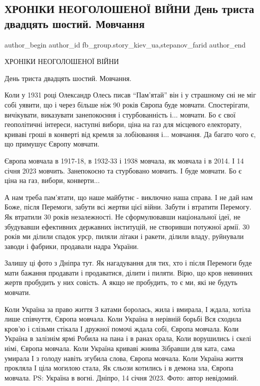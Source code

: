  
 
 
 
 

\subsection{ХРОНІКИ НЕОГОЛОШЕНОЇ ВІЙНИ  День триста двадцять шостий. Мовчання}
\label{sec:15_01_2023.fb.fb_group.story_kiev_ua.1.khron_ki_neogoloshen}
 
\ifcmt
 author_begin
   author_id fb_group.story_kiev_ua,stepanov_farid
 author_end
\fi

ХРОНІКИ НЕОГОЛОШЕНОЇ ВІЙНИ 

День триста двадцять шостий. Мовчання. 

Коли у 1931 році Олександр Олесь писав \enquote{Пам'ятай} він і у страшному сні не
міг собі уявити, що і через більше ніж 90 років Європа буде мовчати.
Спостерігати, вичікувати, виказувати занепокоєння і стурбованність і...
мовчати. Бо є свої геополітичні інтереси, наступні вибори, ціна на газ для
місцевого електорату, криваві гроші в конверті від кремля за лобіювання і...
мовчання. Да багато чого є, що примушує Європу мовчати. 

Європа мовчала в 1917-18, в 1932-33 і 1938 мовчала, як мовчала і в 2014. І
14 січня 2023 мовчить. Занепокоєно та стурбовано мовчить. І буде мовчати. Бо
є ціна на газ, вибори, конверти... 

А нам треба пам'ятати, що наше майбутнє - виключно наша справа. І не дай нам
Боже, після Перемоги, забути всі жертви цієї війни. Забути і втратити
Перемогу. Як втратили 30 років незалежності. Не сформулювавши національної
ідеї, не збудувавши ефективних державних інституцій, не створивши потужної
армії. 30 років ми ділили спадок урср, пиляли літаки і ракети, ділили владу,
руйнували заводи і фабрики, продавали надра України. 

Залишу ці фото з Дніпра тут. Як нагадування для тих, хто і після Перемоги
буде мати бажання продавати і продаватися, ділити і пиляти. Вірю, що кров
невинних жертв пробудить у них совість. А якщо не пробудить, то є ми, які не
будуть мовчати. 

\obeycr
Коли Україна за право
життя
З катами боролась, жила
і вмирала,
І ждала, хотіла лише
співчуття,
Європа мовчала.
Коли Україна в нерівній
борьбі
Вся сходила кров'ю і
слізьми стікала
І дружної помочі ждала
собі,
Європа мовчала.
Коли Україна в залізнім
ярмі
Робила на пана і в
ранах орала,
Коли ворушились і скелі
німі,
Європа мовчала.
Коли Україна криваві
жнива
Зібравши для ката, сама
умирала
І з голоду навіть згубила
слова,
Європа мовчала.
Коли Україна життя прокляла
І ціла могилою стала,
Як сльози котились і в
демона зла,
Європа мовчала.
PS:
Україна в вогні.
Дніпро, 14 січня 2023. 
Фото: автор невідомий.
\restorecr
